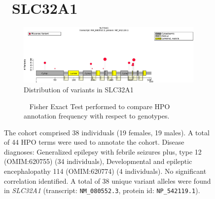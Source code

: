 \begin{figure}[htbp]
\section*{ SLC32A1}
\centering
\begin{subfigure}[b]{0.95\textwidth}
\centering
\includegraphics[width=\textwidth]{ img/SLC32A1_protein_diagram.pdf} 
\captionsetup{justification=raggedright,singlelinecheck=false}
\caption{Distribution of variants in SLC32A1}
\end{subfigure}

\vspace{2em}

\begin{subfigure}[b]{0.95\textwidth}
\centering
{}
\captionsetup{justification=raggedright,singlelinecheck=false}
\caption{             Fisher Exact Test performed to compare HPO annotation frequency with respect to genotypes. }
\end{subfigure}

\vspace{2em}

\caption{ The cohort comprised 38 individuals (19 females, 19 males). A total of 44 HPO terms were used to annotate the cohort. Disease diagnoses: Generalized epilepsy with febrile seizures plus, type 12 (OMIM:620755) (34 individuals), Developmental and epileptic encephalopathy 114 (OMIM:620774) (4 individuals). No significant correlation identified. A total of 38 unique variant alleles were found in \textit{SLC32A1} (transcript: \texttt{NM\_080552.3}, protein id: \texttt{NP\_542119.1}).}
\end{figure}
